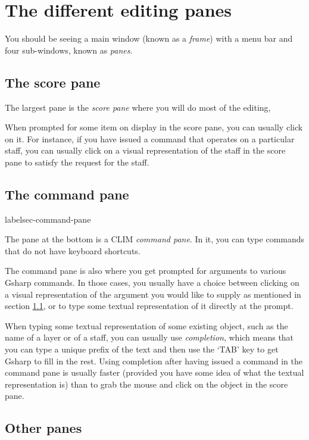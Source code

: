 \documentclass[11pt]{book}
\def\gs{Gsharp}
\def\clim{CLIM}
\def\kbd#1{`#1'}
\begin{document}
\section{The different editing panes}

You should be seeing a main window (known as a \emph{frame}) with a
menu bar and four sub-windows, known as \emph{panes}.  

\subsection{The score pane}
\label{sec-score-pane}

The largest pane is the \emph{score pane} where you will do most of the editing,

When prompted for some item on display in the score pane, you can
usually click on it.  For instance, if you have issued a command that
operates on a particular staff, you can usually click on a visual
representation of the staff in the score pane to satisfy the request
for the staff. 

\subsection{The command pane}
label{sec-command-pane}

The pane at the bottom is a {\clim} \emph{command pane}.  In it, you can type
commands that do not have keyboard shortcuts. 

The command pane is also where you get prompted for arguments to
various {\gs} commands.  In those cases, you usually have a choice
between clicking on a visual representation of the argument you would
like to supply as mentioned in section \ref{sec-score-pane}, or to
type some textual representation of it directly at the prompt. 

When typing some textual representation of some existing object, such
as the name of a layer or of a staff, you can usually use
\emph{completion}, which means that you can type a
unique prefix of the text and then use the \kbd{TAB} key to get {\gs}
to fill in the rest.  Using completion after having issued a command
in the command pane is usually faster (provided you have some idea of
what the textual representation is) than to grab the mouse and click
on the object in the score pane. 

\subsection{Other panes}
\end{document}
